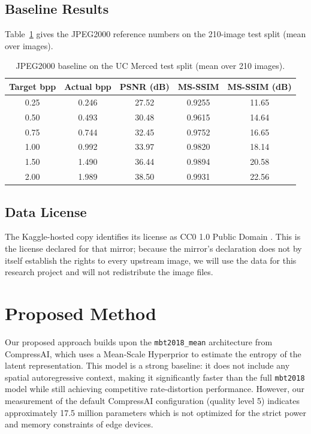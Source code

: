 \documentclass[11pt]{article}
\begin{document}
\subsection{Baseline Results}
Table~\ref{tab:jp2k} gives the JPEG2000 reference numbers on the 210-image test split (mean over images).
 
\begin{table}[h]
\centering
\caption{JPEG2000 baseline on the UC Merced test split (mean over 210 images).}
\label{tab:jp2k}
\begin{tabular}{@{}ccccc@{}}
\toprule
Target bpp & Actual bpp & PSNR (dB) & MS-SSIM & MS-SSIM (dB) \\
\midrule
0.25 & 0.246 & 27.52 & 0.9255 & 11.65 \\
0.50 & 0.493 & 30.48 & 0.9615 & 14.64 \\
0.75 & 0.744 & 32.45 & 0.9752 & 16.65 \\
1.00 & 0.992 & 33.97 & 0.9820 & 18.14 \\
1.50 & 1.490 & 36.44 & 0.9894 & 20.58 \\
2.00 & 1.989 & 38.50 & 0.9931 & 22.56 \\
\bottomrule
\end{tabular}
\end{table}
 
 

\subsection{Data License}
The Kaggle-hosted copy identifies its license as CC0 1.0 Public Domain
\citep{ucmercedkaggle}. This is the license declared for that mirror; because
the mirror's declaration does not by itself establish the rights to every
upstream image, we will use the data for this research project and will not
redistribute the image files.


\section{Proposed Method}
\label{sec:method}
Our proposed approach builds upon the \texttt{mbt2018\_mean} architecture from CompressAI, 
which uses a Mean-Scale Hyperprior to estimate the entropy of the latent representation. 
This model is a strong baseline: it does not include any spatial autoregressive context, 
making it significantly faster than the full \texttt{mbt2018} model 
while still achieving competitive rate-distortion performance. 
However, our measurement of the default CompressAI configuration (quality level 5) indicates approximately 17.5 million parameters 
which is not optimized for the strict power and memory constraints of edge devices.
\end{document}
